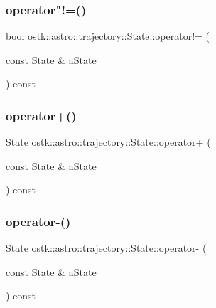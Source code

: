 \mbox{\label{classostk_1_1astro_1_1trajectory_1_1_state_a53ac2b13092bc7777efa14362fec4c46}} 
\subsubsection{\texorpdfstring{operator"!=()}{operator!=()}}
{\footnotesize\ttfamily bool ostk\+::astro\+::trajectory\+::\+State\+::operator!= (\begin{DoxyParamCaption}\item[{const \hyperlink{classostk_1_1astro_1_1trajectory_1_1_state}{State} \&}]{a\+State }\end{DoxyParamCaption}) const}

\mbox{\label{classostk_1_1astro_1_1trajectory_1_1_state_a8d8ff34816c5e4895f9274fc06dbb799}} 
\subsubsection{\texorpdfstring{operator+()}{operator+()}}
{\footnotesize\ttfamily \hyperlink{classostk_1_1astro_1_1trajectory_1_1_state}{State} ostk\+::astro\+::trajectory\+::\+State\+::operator+ (\begin{DoxyParamCaption}\item[{const \hyperlink{classostk_1_1astro_1_1trajectory_1_1_state}{State} \&}]{a\+State }\end{DoxyParamCaption}) const}

\mbox{\label{classostk_1_1astro_1_1trajectory_1_1_state_abd0979467d66ca07b86d5405255d26ed}} 
\subsubsection{\texorpdfstring{operator-\/()}{operator-()}}
{\footnotesize\ttfamily \hyperlink{classostk_1_1astro_1_1trajectory_1_1_state}{State} ostk\+::astro\+::trajectory\+::\+State\+::operator-\/ (\begin{DoxyParamCaption}\item[{const \hyperlink{classostk_1_1astro_1_1trajectory_1_1_state}{State} \&}]{a\+State }\end{DoxyParamCaption}) const}

